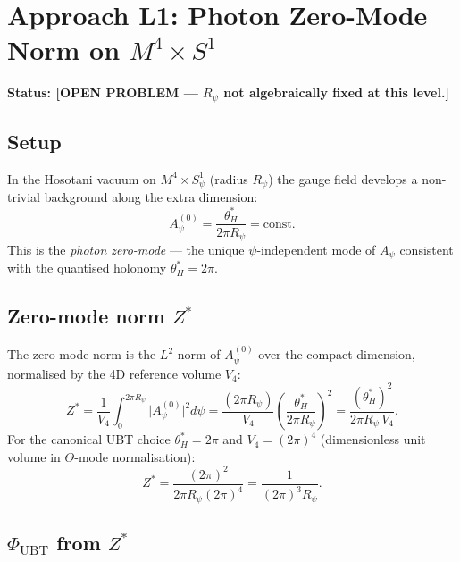 \documentclass[11pt,a4paper]{article}
\theoremstyle{definition}
\theoremstyle{remark}
\begin{document}
\section{Approach L1: Photon Zero-Mode Norm on $M^4\times S^1$}
\label{sec:L1_zeromode}

\textbf{Status: [OPEN PROBLEM — $R_\psi$ not algebraically fixed at this level.]}

\subsection{Setup}

In the Hosotani vacuum on $M^4\times S^1_\psi$ (radius $R_\psi$) the
gauge field develops a non-trivial background along the extra dimension:
\begin{equation}
  A_\psi^{(0)} = \frac{\theta_H^*}{2\pi R_\psi} = \mathrm{const}.
  \label{eq:hosotani_bg}
\end{equation}
This is the \emph{photon zero-mode} — the unique $\psi$-independent mode
of $A_\psi$ consistent with the quantised holonomy $\theta_H^* = 2\pi$.

\subsection{Zero-mode norm $Z^*$}

The zero-mode norm is the $L^2$ norm of $A_\psi^{(0)}$ over the compact
dimension, normalised by the 4D reference volume $V_4$:
\begin{equation}
  Z^*
  = \frac{1}{V_4}\int_0^{2\pi R_\psi}\!\!\bigl|A_\psi^{(0)}\bigr|^2 d\psi
  = \frac{(2\pi R_\psi)}{V_4}\left(\frac{\theta_H^*}{2\pi R_\psi}\right)^{\!2}
  = \frac{(\theta_H^*)^2}{2\pi R_\psi\, V_4}.
  \label{eq:Z_star}
\end{equation}
For the canonical UBT choice $\theta_H^* = 2\pi$ and
$V_4 = (2\pi)^4$ (dimensionless unit volume in $\Theta$-mode normalisation):
\begin{equation}
  Z^* = \frac{(2\pi)^2}{2\pi R_\psi (2\pi)^4}
      = \frac{1}{(2\pi)^3 R_\psi}.
  \label{eq:Z_star_canonical}
\end{equation}

\subsection{$\Phi_{\mathrm{UBT}}$ from $Z^*$}
\end{document}
